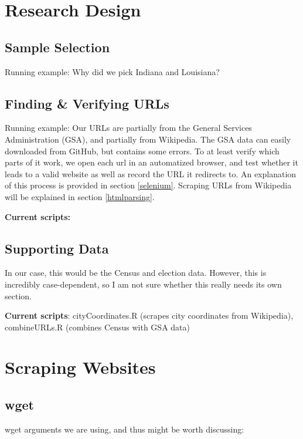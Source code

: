 \documentclass[11pt]{article}
\begin{document}
\newpage
\tableofcontents
\newpage
\section{Research Design}

\subsection{Sample Selection}

Running example: Why did we pick Indiana and Louisiana?

\subsection{Finding \& Verifying URLs}

Running example: Our URLs are partially from the General Services Administration (GSA), and partially from Wikipedia. The GSA data can easily downloaded from GitHub, but contains some errors. To at least verify which parts of it work, we open each url in an automatized browser, and test whether it leads to a valid website as well as record the URL it redirects to. An explanation of this process is provided in section \ref{selenium}. Scraping URLs from Wikipedia will be explained in section \ref{htmlparsing}.

\textbf{Current scripts:}


\subsection{Supporting Data}
In our case, this would be the Census and election data. However, this is incredibly case-dependent, so I am not sure whether this really needs its own section.

\textbf{Current scripts}: cityCoordinates.R (scrapes city coordinates from Wikipedia), combineURLs.R (combines Census with GSA data)

\section{Scraping Websites}
\subsection{wget}

wget arguments we are using, and thus might be worth discussing:
\end{document}

